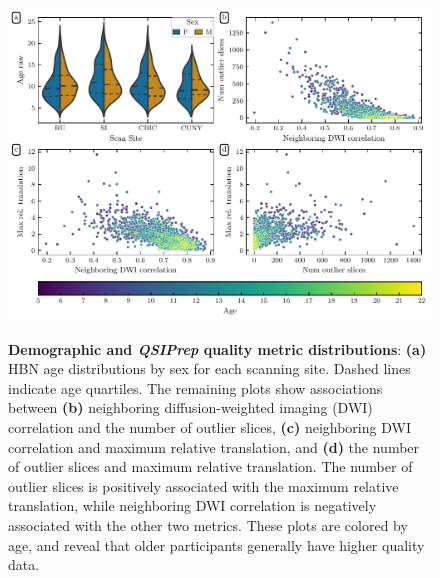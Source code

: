 \documentclass[fleqn,10pt,inline]{wlscirep}
\begin{document}
\begin{figure}[tbp]
    {\label{fig:metric-dist:age}}
    {\label{fig:metric-dist:ndc-slices}}
    {\label{fig:metric-dist:ndc-translation}}
    {\label{fig:metric-dist:slices-translation}}
    \centering
    \includegraphics[width=\linewidth]{bundle-profiles/qsiprep-metric-distributions.pdf}
    \caption{%
        {\bf Demographic and \emph{QSIPrep} quality metric distributions}:
        \textbf{(a)} HBN age distributions by sex for each scanning site. Dashed lines
        indicate age quartiles.
        The remaining plots show associations between \textbf{(b)} neighboring
        diffusion-weighted imaging (DWI) correlation  \cite{yeh2019-kb} and the
        number of outlier slices, \textbf{(c)} neighboring DWI correlation and maximum relative
        translation, and \textbf{(d)} the number of outlier slices and maximum
        relative translation.
        The number of outlier slices is positively associated with the maximum
        relative translation, while neighboring DWI correlation is negatively associated with the other
        two metrics.
        These plots are colored by age, and reveal that older participants
        generally have higher quality data.
    }
    \label{fig:metric-dist}
\end{figure}
\end{document}
